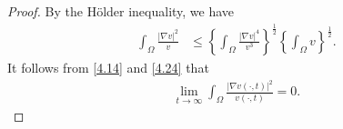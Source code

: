 \documentclass[12pt]{article}
\theoremstyle{plain}
\theoremstyle{definition}
\numberwithin{equation}{section}
\begin{document}
\begin{proof}[Proof] By the H\"{o}lder inequality, we have
\begin{equation*}
\begin{split}
\int_\Omega \frac {|\nabla v|^2}v
&\leq
  \left\{ \int_\Omega\frac {|\nabla v|^4}{v^3}\right\}^{\frac 12}
\left\{\int_\Omega  v \right\} ^{\frac 12}.
\end{split}
\end{equation*}
 It follows from \eqref{4.14} and \eqref{4.24} that
\begin{equation}\label{4.31}
\begin{split}
\displaystyle\lim_{t\rightarrow \infty}
\int_\Omega \frac {|\nabla v(\cdot,t)|^2}{v(\cdot,t)} =0.
\end{split}
\end{equation}


\end{proof}
\end{document}
